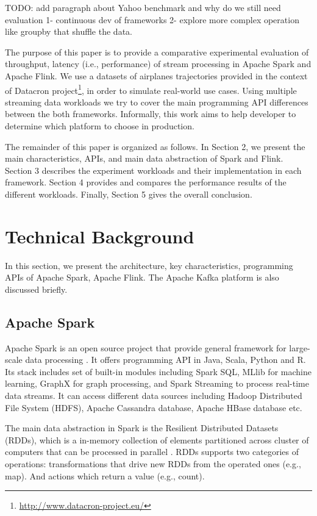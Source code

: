 \documentclass[]{article}
\begin{document}
\par TODO: add paragraph about Yahoo benchmark and why do we still need evaluation 1- continuous dev of frameworks 2- explore more complex operation like groupby that shuffle the data.
\par The purpose of this paper is to provide a comparative experimental evaluation of throughput, latency (i.e., performance) of stream processing in Apache Spark and Apache Flink. We use a datasets of airplanes trajectories provided in the context of Datacron project\footnote{\url{http://www.datacron-project.eu/}}, in order to simulate real-world use cases. Using multiple streaming data workloads we try to cover the main programming API differences between the both frameworks. Informally,  this work aims to help developer to determine which platform to choose in production. 


\par The remainder of this paper is organized as follows.
In Section 2, we present the main characteristics, APIs, and main data abstraction of Spark and Flink. Section 3  describes the experiment workloads and their implementation in each framework. Section 4
provides and compares the performance results of the different workloads. Finally, Section 5 gives the overall conclusion.

\section{Technical Background}
 In this section, we present the architecture, key characteristics, programming APIs  of Apache Spark, Apache Flink. The Apache Kafka platform is also discussed briefly.

\subsection{Apache Spark}

\par Apache Spark is an open source project that provide general framework for large-scale data processing \cite{spark}. It offers programming API in Java, Scala, Python and R. Its stack includes set of built-in modules including Spark SQL, MLlib for machine learning, GraphX for graph processing, and Spark Streaming to process real-time data streams. It can access different data sources including Hadoop Distributed File System (HDFS), Apache Cassandra database, Apache HBase database etc.

\par The main data abstraction in Spark is the Resilient Distributed Datasets (RDDs), which is a in-memory collection of elements partitioned across cluster of computers that can be processed in parallel \cite{rdd}. RDDs supports two categories of operations: transformations that drive new RDDs from the operated ones (e.g., map).  And actions which return a value (e.g., count).
\end{document}
